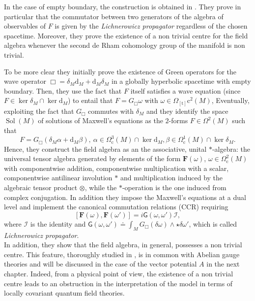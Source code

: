 In the case of empty boundary, the construction is obtained in \cite{dappiaggi2012quantization}. They prove in particular that the commutator between two generators of the algebra of observables of $F$ is given by the \emph{Lichnerowicz propagator} regardless of the chosen spacetime. Moreover, they prove the existence of a non trivial centre for the field algebra whenever the second de Rham cohomology group of the manifold is non trivial.

To be more clear they initially prove the existence of Green operators for the wave operator $\Box=\delta_M\mathrm{d}_M+\mathrm{d}_M\delta_M$ in a globally hyperbolic spacetime with empty boundary. Then, they use the fact that $F$ itself satisfies a wave equation (since $F\in\ker\delta_M\cap\ker\mathrm{d}_M$) to entail that $F=G_\Box\omega$ with $\omega\in\Omega_{[\mathrm{t}]}\mathrm{c}^2(M)$, Eventually, exploiting the fact that $G_\Box$ commutes with $\delta_M$ and they identify the space $\operatorname{Sol}(M)$ of solutions of Maxwell's equations as the $2$-forms $F\in\Omega^2(M)$ such that
\begin{equation}
	F=G_\Box(\delta_M\alpha+\mathrm{d}_M\beta),\ \alpha\in\Omega^3_{\mathrm{c}}(M)\cap\ker\mathrm{d}_M,\beta\in\Omega^1_{\mathrm{c}}(M)\cap\ker\delta_M.
\end{equation}
Hence, they construct the field algebra as an the associative, unital $*$-algebra: the universal tensor algebra generated by elements of the form $\mathbf{F}(\omega)$, $\omega\in\Omega^2_{\mathrm{c}}(M)$ with componentwise addition, componentwise multiplication with a scalar, componentwise antilinear involution $*$ and multiplication induced by the algebraic tensor product $\otimes$, while the $*$-operation is the one induced from complex conjugation.
In addition they impose the Maxwell's equations at a dual level and implement the canonical commutation relations (CCR) requiring
\[	\left[	\mathbf{F}(\omega),\mathbf{F}(\omega')	\right]=i\mathsf{G}(\omega,\omega')	\mathcal{I},	\]
where $\mathcal{I}$ is the identity and $\mathsf{G}(\omega,\omega')\doteq \int_M G_\Box(\delta \omega)\wedge\star\delta \omega'$, which is called \emph{Lichnerowicz propagator}.\\

In addition, they show that the field algebra, in general, possesses a non trivial centre. This feature, thoroughly studied in \cite{Benini-Dappiaggi-Hack-Schenkel-14,Benini:2013tra,Dappiaggi-Hack-Sanders-14}, is in common with Abelian gauge theories and will be discussed in the case of the vector potential $A$ in the next chapter. Indeed, from a physical point of view, the existence of a non trivial centre leads to an obstruction in the interpretation of the model in terms of locally covariant quantum field theories.\\


